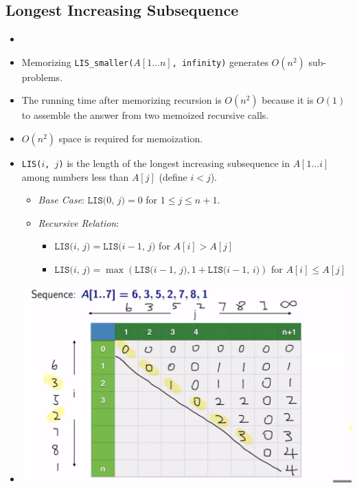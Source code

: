 \subsection{Longest Increasing Subsequence}
\begin{itemize}
    \item[] 
    \item Memorizing \texttt{LIS\_smaller($A[1...n]$, infinity)} generates $O(n^2)$ sub-problems.
    \item The running time after memorizing recursion is $O(n^2)$ because it is $O(1)$ to assemble the answer from two memoized recursive calls.
    \item $O(n^2)$ space is required for memoization.
    \item \texttt{LIS($i$, $j$)} is the length of the longest increasing subsequence in $A[1...i]$ among numbers less than $A[j]$ (define $i < j$).
    \begin{itemize}
        \item \textit{Base Case}: $\texttt{LIS($0$, $j$)} = 0$ for $1 \leq j \leq n + 1$.
        \item \textit{Recursive Relation}:
        \begin{itemize}
            \item $\texttt{LIS($i$, $j$)} = \texttt{LIS($i - 1$, $j$)}$ for $A[i] > A[j]$
            \item $\texttt{LIS($i$, $j$)} = \max(\texttt{LIS($i - 1$, $j$)}, 1 + \texttt{LIS($i - 1$, $i$)})$ for $A[i] \leq A[j]$
        \end{itemize}
    \end{itemize}
    \item[] \includegraphics[width=\textwidth]{lecture13/images/lis-memo.png}
\end{itemize}
